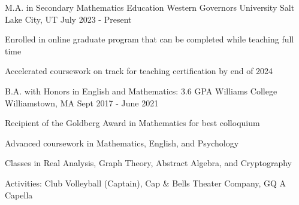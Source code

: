 \begin{cventries}
  \cventry
  {M.A. in Secondary Mathematics Education}
  {Western Governors University}
  {Salt Lake City, UT}
  {July 2023 - Present}
  {
    \begin{cvitems}
      \item {Enrolled in online graduate program that can be completed while teaching full time}
      \item {Accelerated coursework on track for teaching certification by end of 2024}
    \end{cvitems}
  }
  \cventry
  {B.A. with Honors in English and Mathematics: 3.6 GPA}
  {Williams College}
  {Williamstown, MA}
  {Sept 2017 - June 2021}
  {
    \begin{cvitems}
      \item {Recipient of the Goldberg Award in Mathematics for best colloquium}
      \item {Advanced coursework in Mathematics, English, and Psychology}
      \item {Classes in Real Analysis, Graph Theory, Abstract Algebra, and Cryptography}
      \item {Activities: Club Volleyball (Captain), Cap \& Bells Theater Company, GQ A Capella}
    \end{cvitems}
  }
\end{cventries}
